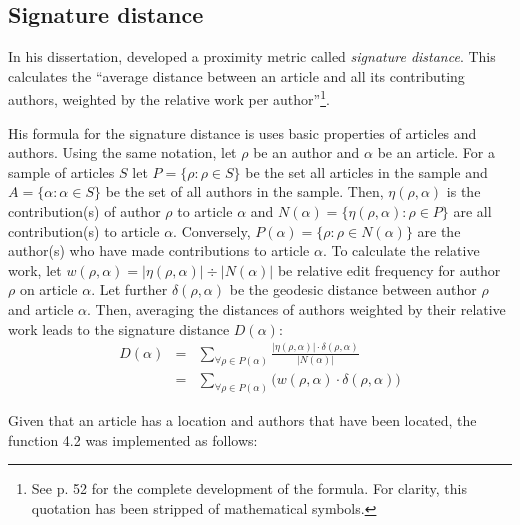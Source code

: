 

\subsection{Signature distance}

In his dissertation, \textcite{hardy2011volunteered} developed a proximity metric called \emph{signature distance}.
This calculates the ``average distance between an article and all its contributing authors, weighted by the relative work
per author''\footnote{See p. 52 for the complete development of the formula. For clarity, this quotation has been stripped of mathematical symbols.}.

His formula for the signature distance is uses basic properties of articles and authors.
Using the same notation, let $\rho$ be an author and $\alpha$ be an article.
For a sample of articles $S$ let $P = \{\rho : \rho \in S\}$ be the set all articles in the sample and $A = \{\alpha : \alpha \in S\}$ be the set of all authors in the sample.
Then, $\eta(\rho,\alpha)$ is the contribution(s) of author $\rho$ to article $\alpha$ and $N(\alpha) = \{\eta(\rho,\alpha) : \rho \in P\}$ are all contribution(s) to article $\alpha$.
Conversely, $P(\alpha) = \{\rho : \rho \in N(\alpha)\}$ are the author(s) who have made contributions to article $\alpha$.
To calculate the relative work, let $w(\rho,\alpha) = |\eta(\rho,\alpha)| \div |N(\alpha)|$ be relative edit frequency for author $\rho$ on article $\alpha$. 
Let further $\delta(\rho,\alpha)$ be the geodesic distance between author $\rho$ and article $\alpha$.
Then, averaging the distances of authors weighted by their relative work leads to the signature distance $D(\alpha)$:
\begin{eqnarray}
D(\alpha) & = & \sum_{\forall \rho \in P(\alpha)} \frac{|\eta(\rho,\alpha)| \cdot \delta(\rho,\alpha)}{|N(\alpha)|} \\
 & = &  \sum_{\forall \rho \in P(\alpha)} \big(w(\rho,\alpha) \cdot \delta(\rho,\alpha)\big)
\end{eqnarray}

Given that an article has a location and authors that have been located, the function 4.2 was implemented as follows:

